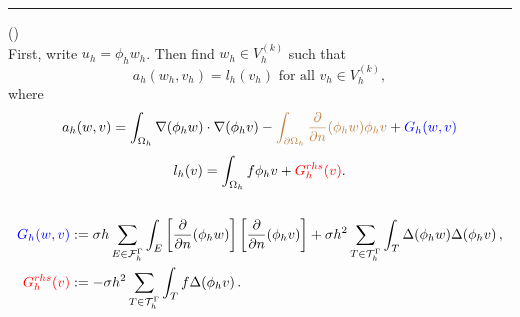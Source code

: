 \begin{frame}[t]
\begin{columns}[T]
    \pause
    \begin{column}{.50\textwidth}
        \color{orange}\rule{\linewidth}{4pt}
        \phifem 
        \color{black} \footnotesize (\cite{Reference3}) \\ \vspace*{1pt}
        First, write $u_h = \phi_h w_h$. Then find $w_h\in V_h^{(k)}$ such that
        \begin{equation*}
          a_h(w_h,v_h)=l_h(v_h)\mbox{ for all }v_h\in V_h^{(k)},
        \end{equation*}
        where
        \begin{equation*}
           a_h(w,v)=\displaystyle \int_{\Omega_h} \nabla (\phi_h w) \cdot \nabla (\phi_h v) -
           \textcolor{brown}{\int_{\partial \Omega_h} \frac{\partial}{\partial n} (\phi_h w) \phi_h
           v} + \textcolor{blue}{G_h (w, v)} 
        \end{equation*}	
           \[\displaystyle   l_h(v) = \int_{\Omega_h} f \phi_h v + \textcolor{red}{G_h^{rhs} (v)}. \]
    \end{column}%
\end{columns}
\pause
\footnotesize
\begin{align*} 
    \textcolor{blue}{G_h(w, v)} &: = \displaystyle\sigma h\sum_{E\in  \mathcal{F}_h^{\Gamma}} 
\int_E \left[ \frac{\partial}{\partial n}
   (\phi_h w) \right] \left[ \frac{\partial}{\partial n} ( \phi_hv)\right] + \sigma h^2 \sum_{T \in \mathcal{T}_h^{\Gamma}} \int_T \Delta(\phi_h w) \Delta(\phi_h v)  
    \,, \\
    \textcolor{red}{G_h^{rhs} (v)} &: =\displaystyle- \sigma h^2\sum_{T \in\mathcal{T}_h^{\Gamma}} \int_T f \Delta (\phi_h v)   
   \,.
\end{align*}

\end{frame}


